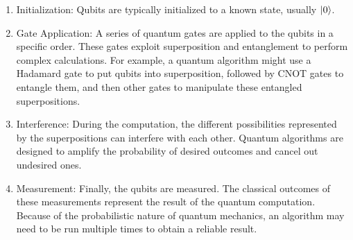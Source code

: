 \documentclass{article}
\begin{document}
 \begin{enumerate}
     \item Initialization: Qubits are typically initialized to a known state, usually $\ket{0}$.

     \item Gate Application: A series of quantum gates are applied to the qubits in a specific order. These gates exploit superposition and entanglement to perform complex calculations. For example, a quantum algorithm might use a Hadamard gate to put qubits into superposition, followed by CNOT gates to entangle them, and then other gates to manipulate these entangled superpositions.

     \item Interference: During the computation, the different possibilities represented by the superpositions can interfere with each other. Quantum algorithms are designed to amplify the probability of desired outcomes and cancel out undesired ones.

     \item Measurement: Finally, the qubits are measured. The classical outcomes of these measurements represent the result of the quantum computation. Because of the probabilistic nature of quantum mechanics, an algorithm may need to be run multiple times to obtain a reliable result.
\end{enumerate}
\newpage
\newpage
\end{document}
